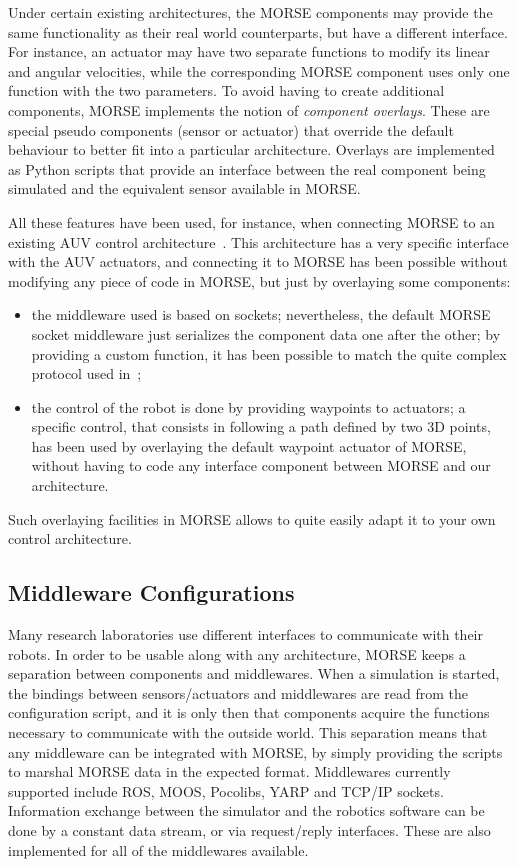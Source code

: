 \documentclass{llncs}
\begin{document}
Under certain existing architectures, the MORSE components may provide the same
functionality as their real world counterparts, but have a different interface.
For instance, an actuator may have two separate functions to modify its linear
and angular velocities, while the corresponding MORSE component uses only one
function with the two parameters.  To avoid having to create additional
components, MORSE implements the notion of \emph{component overlays}. These are
special pseudo components (sensor or actuator) that override the default
behaviour to better fit into a particular architecture. Overlays are
implemented as Python scripts that provide an interface between the real
component being simulated and the equivalent sensor available in MORSE.

All these features have been used, for instance, when connecting MORSE to an
existing AUV control architecture~\cite{barbier2011}. This architecture has a
very specific interface with the AUV actuators, and connecting it to MORSE has
been possible without modifying any piece of code in MORSE, but just by
overlaying some components:
\begin{itemize}
  \item the middleware used is based on sockets; nevertheless, the default
    MORSE socket middleware just serializes the component data one after the
    other; by providing a custom function, it has been possible to match 
    the quite complex protocol used in~\cite{barbier2011};
  \item the control of the robot is done by providing waypoints to actuators; a
    specific control, that consists in following a path defined by two 3D
    points, has been used by overlaying the default waypoint actuator of
    MORSE, without having to code any interface component between MORSE and
    our architecture.
\end{itemize}

Such overlaying facilities in MORSE allows to quite easily adapt it to your own
control architecture.



\subsection {Middleware Configurations}
\label{section:middlewares}

Many research laboratories use different interfaces to communicate with their
robots. In order to be usable along with any architecture, MORSE keeps a
separation between components and middlewares.  When a simulation is started,
the bindings between sensors/actuators and middlewares are read from the
configuration script, and it is only then that components acquire the functions
necessary to communicate with the outside world.
This separation means that any middleware can be integrated with MORSE, by
simply providing the scripts to marshal MORSE data in the expected format.
Middlewares currently supported include ROS, MOOS, Pocolibs, YARP and
TCP/IP sockets.
Information exchange between the simulator and the robotics software can be
done by a constant data stream, or via request/reply interfaces. These are also
implemented for all of the middlewares available.
\end{document}
